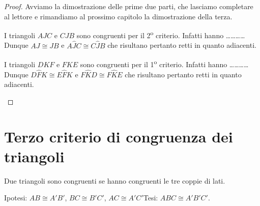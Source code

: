 \begin{proof}
Avviamo la dimostrazione delle prime due parti, che lasciamo completare al lettore e rimandiamo al prossimo capitolo la dimostrazione della terza.

\begin{enumeratea}
\item I triangoli $AJC$ e $CJB$ sono congruenti per il 2\textsuperscript{o} criterio. Infatti hanno \ldots\ldots\ldots\ldots{}\\
Dunque $AJ\cong JB$ e $A\widehat{J}C\cong C\widehat{J}B$ che risultano pertanto retti in quanto adiacenti.  
\item I triangoli $DKF$ e $FKE$ sono congruenti per il 1\textsuperscript{o} criterio. Infatti hanno \ldots\ldots\ldots\ldots{}\\
Dunque $D\widehat{F}K\cong E\widehat{F}K$ e $F\widehat{K}D\cong F\widehat{K}E$ che risultano pertanto retti in quanto adiacenti.
\end{enumeratea}
\end{proof}

\section{Terzo criterio di congruenza dei triangoli}

\begin{teorema}
Due triangoli sono congruenti se hanno congruenti le tre coppie di lati.
\end{teorema}

\noindent Ipotesi: $AB\cong A'B'$, $BC\cong B'C'$, $AC\cong A'C'$\tab Tesi: $ABC\cong A'B'C'$.

